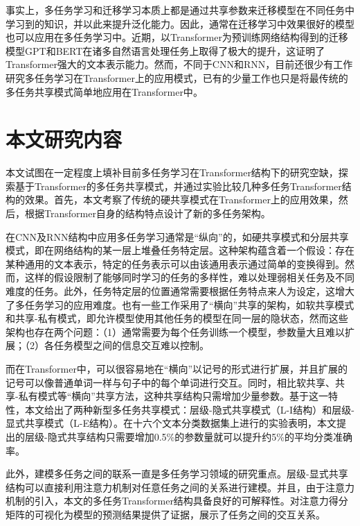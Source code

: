 事实上，多任务学习和迁移学习本质上都是通过共享参数来迁移模型在不同任务中学习到的知识，并以此来提升泛化能力。因此，通常在迁移学习中效果很好的模型也可以应用在多任务学习中。近期，以Transformer为预训练网络结构得到的迁移模型GPT\cite{radford2018improving}和BERT\cite{devlin2018bert}在诸多自然语言处理任务上取得了极大的提升，这证明了Transformer强大的文本表示能力。然而，不同于CNN和RNN，目前还很少有工作研究多任务学习在Transformer上的应用模式，已有的少量工作也只是将最传统的多任务共享模式简单地应用在Transformer中\cite{liu2019multi}。

\section{本文研究内容}

本文试图在一定程度上填补目前多任务学习在Transformer结构下的研究空缺，探索基于Transformer的多任务共享模式，并通过实验比较几种多任务Transformer结构的效果。首先，本文考察了传统的硬共享模式在Transformer上的应用效果，然后，根据Transformer自身的结构特点设计了新的多任务架构。

在CNN及RNN结构中应用多任务学习通常是“纵向”的，如硬共享模式和分层共享模式，即在网络结构的某一层上堆叠任务特定层\cite{DBLP:conf/acl/SogaardG16}\cite{DBLP:conf/ijcai/ZhengCQ18}。这种架构蕴含着一个假设：存在某种通用的文本表示，特定的任务表示可以由该通用表示通过简单的变换得到。然而，这样的假设限制了能够同时学习的任务的多样性，难以处理弱相关任务及不同难度的任务。此外，任务特定层的位置通常需要根据任务特点来人为设定，这增大了多任务学习的应用难度。也有一些工作采用了“横向”共享的架构，如软共享模式和共享-私有模式，即允许模型使用其他任务的模型在同一层的隐状态\cite{DBLP:conf/ijcai/LiuQH16}\cite{DBLP:conf/cvpr/MisraSGH16}\cite{1705.08142}，然而这些架构也存在两个问题：（1）通常需要为每个任务训练一个模型，参数量大且难以扩展；（2）各任务模型之间的信息交互难以控制。

而在Transformer中，可以很容易地在“横向”以记号的形式进行扩展，并且扩展的记号可以像普通单词一样与句子中的每个单词进行交互。同时，相比软共享、共享-私有模式等“横向”共享方法，这种共享结构只需增加少量参数。基于这一特性，本文给出了两种新型多任务共享模式：层级-隐式共享模式（L-I结构）和层级-显式共享模式（L-E结构）。在十六个文本分类数据集上进行的实验表明，本文提出的层级-隐式共享结构只需要增加0.5\%的参数量就可以提升约5\%的平均分类准确率。

此外，建模多任务之间的联系一直是多任务学习领域的研究重点。层级-显式共享结构可以直接利用注意力机制对任意任务之间的关系进行建模。并且，由于注意力机制的引入，本文的多任务Transformer结构具备良好的可解释性。对注意力得分矩阵的可视化为模型的预测结果提供了证据，展示了任务之间的交互关系。

